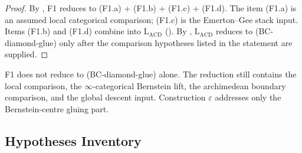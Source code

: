 \begin{proof}
By , F1 reduces to
(F1.a) + (F1.b) + (F1.c) + (F1.d). The item (F1.a) is an assumed
local categorical comparison; (F1.c) is the Emerton--Gee stack input.
Items (F1.b) and (F1.d) combine into \(\mathrm{L}_{\mathrm{ACD}}\)
(). By
, \(\mathrm{L}_{\mathrm{ACD}}\)
reduces to (BC-diamond-glue) only after the comparison hypotheses
listed in the statement are supplied.
\end{proof}

\begin{remark}
\label{v4-arith:lacd:rem:F1-form}
F1 does not reduce to (BC-diamond-glue) alone. The reduction still
contains the local comparison, the \(\infty\)-categorical Bernstein
lift, the archimedean boundary comparison, and the global descent
input. Construction \(\varepsilon\) addresses only the Bernstein-centre
gluing part.
\end{remark}

\subsection{Hypotheses Inventory}

